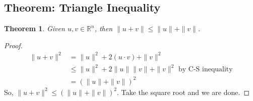\documentclass{report}
\newtheorem{_thm}{Theorem}
\theoremstyle{definition}
\begin{document}
\subsection{Theorem: Triangle Inequality}

\begin{_thm}
Given \(u,v\in \mathbb{R}^n\), then \(\|u+v\|\leq \|u\|+\|v\|\).
\end{_thm}

\begin{proof}
\begin{align*}
\|u+v\|^2 &= \|u\|^2+2(u\cdot v)+\|v\|^2 \\
&\leq \|u\|^2+2\|u\|\|v\|+\|v\|^2 \text{ by C-S inequality} \\
&= (\|u\|+\|v\|)^2
\end{align*}
So, \(\|u+v\|^2\leq (\|u\|+\|v\|)^2\).
Take the square root and we are done.
\end{proof}
\end{document}
